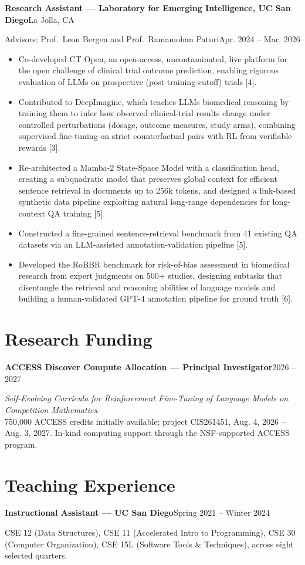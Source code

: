 \documentclass[11pt]{article}
\newcommand{\entry}[2]{\noindent\textbf{#1}\hfill #2\par}
\newcommand{\subentry}[2]{\noindent #1\hfill #2\par}
\begin{document}
\entry{Research Assistant --- Laboratory for Emerging Intelligence, UC San Diego}{La Jolla, CA}
\subentry{Advisors: Prof.\ Leon Bergen and Prof.\ Ramamohan Paturi}{Apr. 2024 -- Mar. 2026}
\begin{itemize}[leftmargin=1.2em, itemsep=2pt, topsep=4pt]
    \item Co-developed CT Open, an open-access, uncontaminated, live platform for the open challenge of clinical trial outcome prediction, enabling rigorous evaluation of LLMs on prospective (post-training-cutoff) trials [4].
    \item Contributed to DeepImagine, which teaches LLMs biomedical reasoning by training them to infer how observed clinical-trial results change under controlled perturbations (dosage, outcome measures, study arms), combining supervised fine-tuning on strict counterfactual pairs with RL from verifiable rewards [3].
    \item Re-architected a Mamba-2 State-Space Model with a classification head, creating a subquadratic model that preserves global context for efficient sentence retrieval in documents up to 256k tokens, and designed a link-based synthetic data pipeline exploiting natural long-range dependencies for long-context QA training [5].
    \item Constructed a fine-grained sentence-retrieval benchmark from 41 existing QA datasets via an LLM-assisted annotation-validation pipeline [5].
    \item Developed the RoBBR benchmark for risk-of-bias assessment in biomedical research from expert judgments on 500+ studies, designing subtasks that disentangle the retrieval and reasoning abilities of language models and building a human-validated GPT-4 annotation pipeline for ground truth [6].
\end{itemize}

\section{Research Funding}
\entry{ACCESS Discover Compute Allocation --- Principal Investigator}{2026 -- 2027}
\textit{Self-Evolving Curricula for Reinforcement Fine-Tuning of Language Models on Competition Mathematics}.\\
750,000 ACCESS credits initially available; project CIS261451, Aug. 4, 2026 -- Aug. 3, 2027. In-kind computing support through the NSF-supported ACCESS program.

\section{Teaching Experience}
\entry{Instructional Assistant --- UC San Diego}{Spring 2021 -- Winter 2024}
CSE 12 (Data Structures), CSE 11 (Accelerated Intro to Programming), CSE 30 (Computer Organization), CSE 15L (Software Tools \& Techniques), across eight selected quarters.
\end{document}
